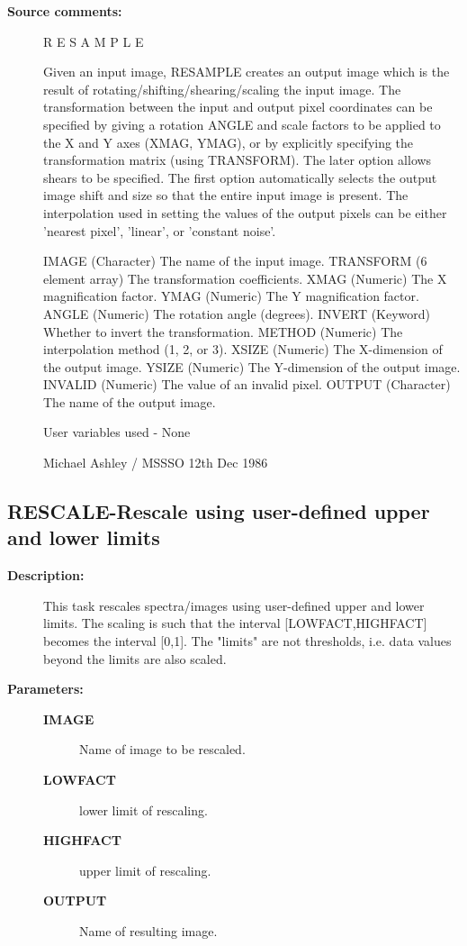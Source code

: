 \begin{description}
\begin{description}
\item [\textbf{Source comments:}]
\begin{terminalv}
 R E S A M P L E

 Given an input image, RESAMPLE creates an output image which
 is the result of rotating/shifting/shearing/scaling the input
 image. The transformation between the input and output pixel
 coordinates can be specified by giving a rotation ANGLE and
 scale factors to be applied to the X and Y axes (XMAG, YMAG),
 or by explicitly specifying the transformation matrix (using
 TRANSFORM). The later option allows shears to be specified.
 The first option automatically selects the output image
 shift and size so that the entire input image is present.
 The interpolation used in setting the values of the output
 pixels can be either 'nearest pixel', 'linear', or 'constant
 noise'.

 IMAGE      (Character) The name of the input image.
 TRANSFORM  (6 element array) The transformation coefficients.
 XMAG       (Numeric) The X magnification factor.
 YMAG       (Numeric) The Y magnification factor.
 ANGLE      (Numeric) The rotation angle (degrees).
 INVERT     (Keyword) Whether to invert the transformation.
 METHOD     (Numeric) The interpolation method (1, 2, or 3).
 XSIZE      (Numeric) The X-dimension of the output image.
 YSIZE      (Numeric) The Y-dimension of the output image.
 INVALID    (Numeric) The value of an invalid pixel.
 OUTPUT     (Character) The name of the output image.

 User variables used -  None

                              Michael Ashley / MSSSO 12th Dec 1986
\end{terminalv}
\end{description}
\subsection{RESCALE-\label{RESCALE}Rescale using user-defined upper and lower limits}
\begin{description}

\item [\textbf{Description:}]
 This task rescales spectra/images using user-defined upper
 and lower limits.  The scaling is such that the interval
 [LOWFACT,HIGHFACT] becomes the interval [0,1]. The "limits"
 are not thresholds, i.e. data values beyond the limits are
 also scaled.

\item [\textbf{Parameters:}]
\begin{description}
\item [\textbf{IMAGE}]
 Name of image to be rescaled.
\item [\textbf{LOWFACT}]
 lower limit of rescaling.
\item [\textbf{HIGHFACT}]
 upper limit of rescaling.
\item [\textbf{OUTPUT}]
 Name of resulting image.
\end{description}


\end{description}
\end{description}
